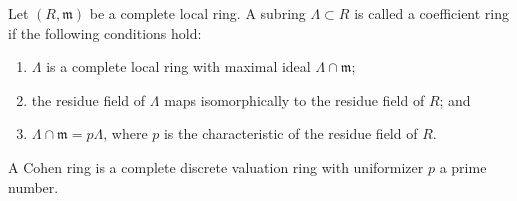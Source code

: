 \begin{definition}[10.160.4--5]
Let $(R,\mathfrak m)$ be a complete local ring. A subring $\Lambda\subset R$ is called a coefficient ring if the following conditions hold:
\begin{enumerate}
\item $\Lambda$ is a complete local ring with maximal ideal $\Lambda\cap\mathfrak m$;
\item the residue field of $\Lambda$ maps isomorphically to the residue field of $R$; and
\item $\Lambda\cap\mathfrak m=p\Lambda$, where $p$ is the characteristic of the residue field of $R$.
\end{enumerate}
A Cohen ring is a complete discrete valuation ring with uniformizer $p$ a prime number.
\end{definition}


